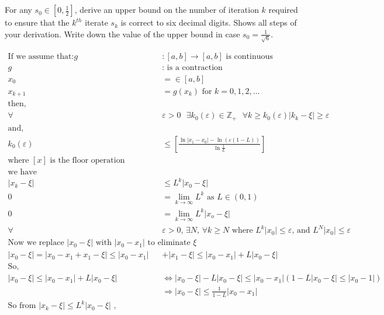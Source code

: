 \documentclass{article}
\begin{document}
\section{}
For any $s_0 \in \left[0, \frac{1}{2} \right]$, derive an upper bound on the number of iteration $k$ required to ensure that the $k^{th}$ iterate $s_k$ is correct to six decimal digits. Shows all steps of your derivation. Write down the value of the upper bound in case $s_0 = \frac{1}{\sqrt{6}}$.
\vspace{10mm}

\begin{align*}
    \text{If we assume that:}
    g&:[a,b] \to [a,b] \text{ is continuous}\\
    g&: \text{ is a contraction}\\
    x_0&=\in [a,b]\\
    x_{k+1}&= g(x_k) \text{ for }k=0,1,2, \dots \\
    \text{then,}&\\ 
    \forall& \varepsilon>0 \text{ }\exists k_0(\varepsilon)\in \mathbb{Z}_+ \text{ } \forall k \ge k_0(\varepsilon) |k_k-\xi|\ge \varepsilon\\
    \text{and,}&\\
    k_0(\varepsilon)& \le \left[ \frac{\ln{|x_1-x_0|}-\ln{(\varepsilon(1-L))}} {\ln{\frac{1}{L}}}\right]\\
    \text{where $[x]$ is the floor operation}&\\
    \text{we have}&\\
    |x_k-\xi|& \le L^k|x_0-\xi|\\
    0&=\lim_{k \to \infty}L^k \text{ as }L \in (0,1)\\
    0&=\lim_{k \to \infty}L^k|x_o-\xi|\\
    \forall& \varepsilon>0 \text{, }\exists N \text{, }\forall k \ge N \text{ where }L^k|x_0|\le \varepsilon\text{, and }L^N|x_0|\le \varepsilon\\
    \text{Now we replace $|x_0-\xi|$ with $|x_0-x_1|$ to eliminate $\xi$}\\
    |x_0-\xi| = |x_0-x_1+x_1-\xi| \le |x_0-x_1|&+|x_1-\xi| \le |x_0-x_1| + L|x_0-\xi|\\
    \text{So, }&\\
    |x_0-\xi| \le |x_0-x_1| +L|x_0-\xi| &\Longleftrightarrow{} |x_0-\xi|-L|x_0-\xi| \le|x_0-x_1|(1-L|x_0-\xi|\le |x_0-1|)\\
    &\Rightarrow |x_0-\xi| \le \frac{1}{1-L}|x_0-x_1|\\
    \text{So from  $|x_k-\xi| \le L^k|x_0-\xi|$ ,}&\\

\end{align*}
\end{document}
